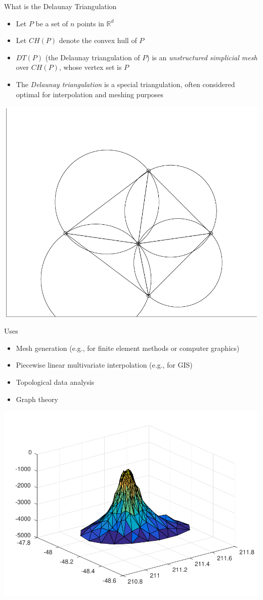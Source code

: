 \documentclass[xcolor=dvipsnames]{beamer}
\begin{document}
\begin{frame}{What is the Delaunay Triangulation}
\begin{itemize}
\item Let $P$ be a set of $n$ points in $\mathbb{R}^d$
\item Let $CH(P)$ denote the convex hull of $P$
\item $DT(P)$ (the Delaunay triangulation of $P$) is an 
{\it unstructured simplicial mesh} over $CH(P)$, whose vertex set is $P$
\item The {\it Delaunay triangulation} is a special triangulation, often
considered optimal for interpolation and meshing purposes
\end{itemize}
\begin{center}
\includegraphics[width=0.4\columnwidth]{../img/delaunay_old/delaunayplane-eps-converted-to.pdf}
\end{center}
\end{frame}
\begin{frame}{Uses}
\begin{itemize}
\item Mesh generation (e.g., for finite element methods or computer graphics)
\item Piecewise linear multivariate interpolation (e.g., for GIS)
\item Topological data analysis
\item Graph theory
\end{itemize}
\begin{center}
\includegraphics[width=0.4\columnwidth]{../img/delaunay_old/seamount-eps-converted-to.pdf}
\end{center}
\end{frame}
\end{document}
